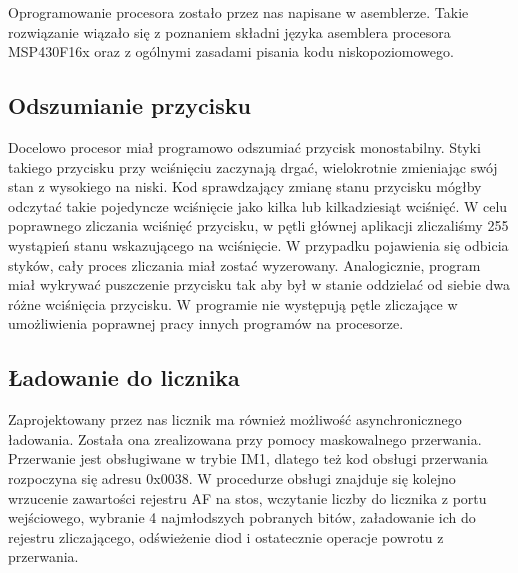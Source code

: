 \documentclass[a4paper,titlepage,11pt,floatssmall]{mwrep}
\begin{document}
\indent{} Oprogramowanie procesora zostało przez nas napisane w asemblerze. Takie rozwiązanie wiązało się z poznaniem składni języka asemblera procesora MSP430F16x oraz z ogólnymi zasadami pisania kodu niskopoziomowego. 
\subsection{Odszumianie przycisku}
\indent{} Docelowo procesor miał programowo odszumiać przycisk monostabilny. Styki takiego przycisku przy wciśnięciu zaczynają drgać, wielokrotnie zmieniając swój stan z wysokiego na niski. Kod sprawdzający zmianę stanu przycisku mógłby odczytać takie pojedyncze wciśnięcie jako kilka lub kilkadziesiąt wciśnięć. W celu poprawnego zliczania wciśnięć przycisku, w pętli głównej aplikacji zliczaliśmy 255 wystąpień stanu wskazującego na wciśnięcie. W przypadku pojawienia się odbicia styków, cały proces zliczania miał zostać  wyzerowany. Analogicznie, program miał wykrywać puszczenie przycisku tak aby był w stanie oddzielać od siebie dwa różne wciśnięcia przycisku. W programie nie występują pętle zliczające w umożliwienia poprawnej pracy innych programów na procesorze.
\subsection{Ładowanie do licznika}
\indent{} Zaprojektowany przez nas licznik ma również możliwość asynchronicznego ładowania. Została ona zrealizowana przy pomocy maskowalnego przerwania. Przerwanie jest obsługiwane w trybie IM1, dlatego też kod obsługi przerwania rozpoczyna się adresu 0x0038. W procedurze obsługi znajduje się kolejno wrzucenie zawartości rejestru AF na stos, wczytanie liczby do licznika z portu wejściowego, wybranie 4 najmłodszych pobranych bitów, załadowanie ich do rejestru zliczającego, odświeżenie diod i ostatecznie operacje powrotu z przerwania. 

\end{document}
